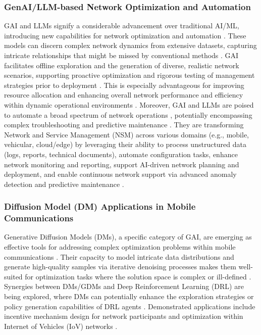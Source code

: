 \documentclass[sigconf]{acmart}
\begin{document}
\subsubsection{GenAI/LLM-based Network Optimization and Automation}\label{subsubsec:genai_optimization}
GAI and LLMs signify a considerable advancement over traditional AI/ML, introducing new capabilities for network optimization and automation \cite{ref9,ref26}. These models can discern complex network dynamics from extensive datasets, capturing intricate relationships that might be missed by conventional methods \cite{ref9}. GAI facilitates offline exploration and the generation of diverse, realistic network scenarios, supporting proactive optimization and rigorous testing of management strategies prior to deployment \cite{ref9}. This is especially advantageous for improving resource allocation and enhancing overall network performance and efficiency within dynamic operational environments \cite{ref9}. Moreover, GAI and LLMs are poised to automate a broad spectrum of network operations \cite{ref17,ref18,ref25}, potentially encompassing complex troubleshooting and predictive maintenance \cite{ref2,ref18,ref25}. They are transforming Network and Service Management (NSM) across various domains (e.g., mobile, vehicular, cloud/edge) by leveraging their ability to process unstructured data (logs, reports, technical documents), automate configuration tasks, enhance network monitoring and reporting, support AI-driven network planning and deployment, and enable continuous network support via advanced anomaly detection and predictive maintenance \cite{ref25}.

\subsubsection{Diffusion Model (DM) Applications in Mobile Communications}
\label{subsubsec:dm_mobile}
Generative Diffusion Models (DMs), a specific category of GAI, are emerging as effective tools for addressing complex optimization problems within mobile communications \cite{ref19, ref33}. Their capacity to model intricate data distributions and generate high-quality samples via iterative denoising processes makes them well-suited for optimization tasks where the solution space is complex or ill-defined \cite{ref19, ref33}. Synergies between DMs/GDMs and Deep Reinforcement Learning (DRL) are being explored, where DMs can potentially enhance the exploration strategies or policy generation capabilities of DRL agents \cite{ref19}. Demonstrated applications include incentive mechanism design for network participants and optimization within Internet of Vehicles (IoV) networks \cite{ref19}.
\end{document}
